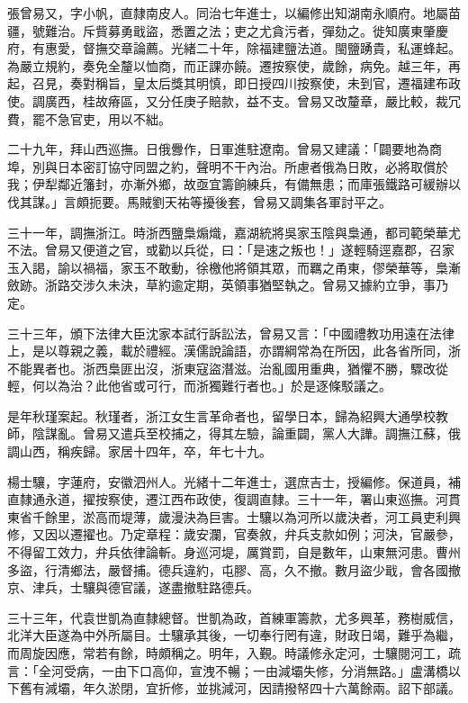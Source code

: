 \begin{pinyinscope}
張曾易又，字小帆，直隸南皮人。同治七年進士，以編修出知湖南永順府。地屬苗疆，號難治。斥貲募勇戢盜，悉置之法；吏之尤貪污者，彈劾之。徙知廣東肇慶府，有惠愛，督撫交章論薦。光緒二十年，除福建鹽法道。閩鹽踴貴，私運蜂起。為嚴立規約，奏免全釐以恤商，而正課亦饒。遷按察使，歲餘，病免。越三年，再起，召見，奏對稱旨，皇太后獎其明慎，即日授四川按察使，未到官，遷福建布政使。調廣西，桂故瘠區，又分任庚子賠款，益不支。曾易又改釐章，嚴比較，裁冗費，罷不急官吏，用以不絀。

二十九年，拜山西巡撫。日俄釁作，日軍進駐遼南。曾易又建議：「闢要地為商埠，別與日本密訂協守同盟之約，聲明不干內治。所慮者俄為日敗，必將取償於我；伊犁鄰近籓封，亦漸外鄉，故亟宜籌餉練兵，有備無患；而庫張鐵路可緩辦以伐其謀。」言頗扼要。馬賊劉天祐等擾後套，曾易又調集各軍討平之。

三十一年，調撫浙江。時浙西鹽梟煽熾，嘉湖統將吳家玉陰與梟通，都司範榮華尤不法。曾易又便道之官，或勸以兵從，曰：「是速之叛也！」遂輕騎逕嘉郡，召家玉入謁，諭以禍福，家玉不敢動，徐檄他將領其眾，而羈之甬東，僇榮華等，梟漸斂跡。浙路交涉久未決，草約逾定期，英領事猶堅執之。曾易又據約立爭，事乃定。

三十三年，頒下法律大臣沈家本試行訴訟法，曾易又言：「中國禮教功用遠在法律上，是以尊親之義，載於禮經。漢儒說論語，亦謂綱常為在所因，此各省所同，浙不能異者也。浙西梟匪出沒，浙東寇盜潛滋。治亂國用重典，猶懼不勝，驟改從輕，何以為治？此他省或可行，而浙獨難行者也。」於是逐條駁議之。

是年秋瑾案起。秋瑾者，浙江女生言革命者也，留學日本，歸為紹興大通學校教師，陰謀亂。曾易又遣兵至校捕之，得其左驗，論重闢，黨人大譁。調撫江蘇，俄調山西，稱疾歸。家居十四年，卒，年七十九。

楊士驤，字蓮府，安徽泗州人。光緒十二年進士，選庶吉士，授編修。保道員，補直隸通永道，擢按察使，遷江西布政使，復調直隸。三十一年，署山東巡撫。河貫東省千餘里，淤高而堤薄，歲漫決為巨害。士驤以為河所以歲決者，河工員吏利興修，又因以遷擢也。乃定章程：歲安瀾，官奏敘，弁兵支款如例；河決，官嚴參，不得留工效力，弁兵依律論斬。身巡河堤，厲賞罰，自是數年，山東無河患。曹州多盜，行清鄉法，嚴督捕。德兵違約，屯膠、高，久不撤。數月盜少戢，會各國撤京、津兵，士驤與德官議，遂盡撤駐路德兵。

三十三年，代袁世凱為直隸總督。世凱為政，首練軍籌款，尤多興革，務樹威信，北洋大臣遂為中外所屬目。士驤承其後，一切奉行罔有違，財政日竭，難乎為繼，而周旋因應，常若有餘，時頗稱之。明年，入覲。時議修永定河，士驤閱河工，疏言：「全河受病，一由下口高仰，宣洩不暢；一由減壩失修，分消無路。」盧溝橋以下舊有減壩，年久淤閉，宜折修，並挑減河，因請撥帑四十六萬餘兩。詔下部議。


\end{pinyinscope}
